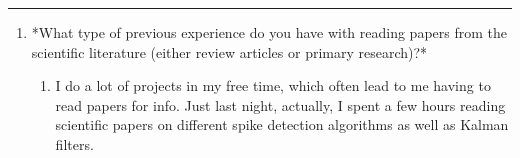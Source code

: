 \documentclass[letterpaper]{article}
\begin{document}
\noindent\rule{\textwidth}{0.5pt}

\begin{enumerate}
\item *What type of previous experience do you have with reading papers
from the scientific literature (either review articles or primary
research)?*

\begin{enumerate}
\item I do a lot of projects in my free time, which often lead to me
having to read papers for info. Just last night, actually, I spent
a few hours reading scientific papers on different spike detection
algorithms as well as Kalman filters.
\end{enumerate}
\end{enumerate}
\end{document}
